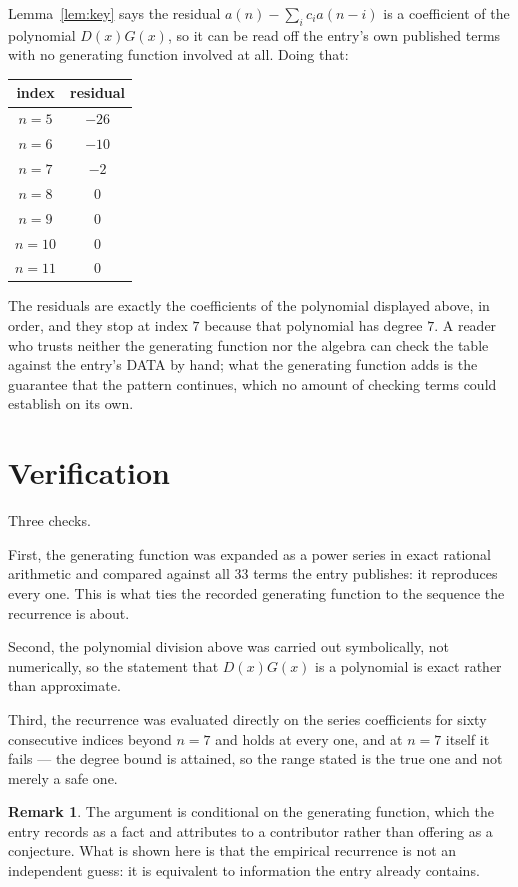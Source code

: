 \documentclass[11pt,a4paper]{article}
\theoremstyle{plain}
\theoremstyle{definition}
\newtheorem{remark}[theorem]{Remark}
\begin{document}
Lemma~\ref{lem:key} says the residual $a(n)-\sum_ic_ia(n-i)$ is a coefficient of the
polynomial $D(x)G(x)$, so it can be read off the entry's own published terms with no
generating function involved at all. Doing that:
\begin{center}
\begin{tabular}{cc}
index & residual \\ \hline
$n=5$ & $-26$ \\
$n=6$ & $-10$ \\
$n=7$ & $-2$ \\
$n=8$ & $0$ \\
$n=9$ & $0$ \\
$n=10$ & $0$ \\
$n=11$ & $0$
\end{tabular}
\end{center}
The residuals are exactly the coefficients of the polynomial displayed above, in order, and
they stop at index $7$ because that polynomial has degree $7$. A reader who trusts
neither the generating function nor the algebra can check the table against the entry's DATA
by hand; what the generating function adds is the guarantee that the pattern continues, which
no amount of checking terms could establish on its own.

\section{Verification}

Three checks.

First, the generating function was expanded as a power series in exact rational arithmetic and
compared against all $33$ terms the entry publishes: it reproduces every one. This is
what ties the recorded generating function to the sequence the recurrence is about.

Second, the polynomial division above was carried out symbolically, not numerically, so the
statement that $D(x)G(x)$ is a polynomial is exact rather than approximate.

Third, the recurrence was evaluated directly on the series coefficients for sixty consecutive
indices beyond $n=7$ and holds at every one, and at $n=7$ itself it fails --- the
degree bound is attained, so the range stated is the true one and not merely a safe one.

\begin{remark}
The argument is conditional on the generating function, which the entry records as a fact and
attributes to a contributor rather than offering as a conjecture. What is shown here is that
the empirical recurrence is not an independent guess: it is equivalent to information the
entry already contains.
\end{remark}
\end{document}
